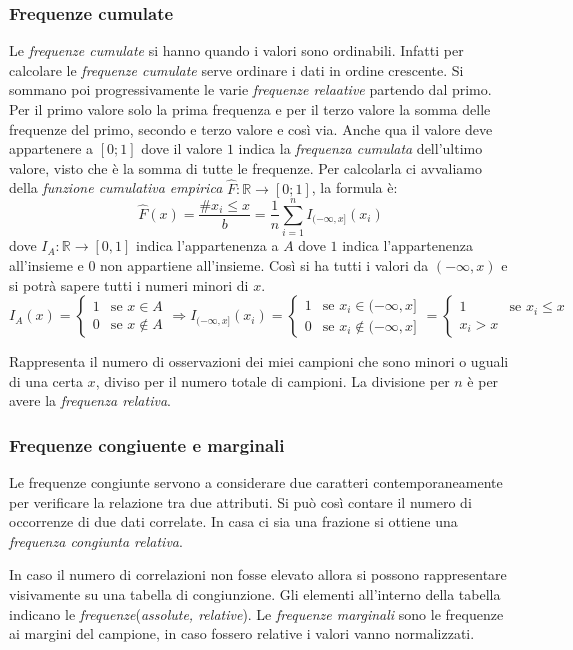 \documentclass{article}
\begin{document}
      \subsubsection*{Frequenze cumulate}
        Le \textit{frequenze cumulate} si hanno quando i valori sono ordinabili. Infatti per calcolare le \textit{frequenze cumulate} serve ordinare i dati in ordine crescente. Si sommano poi progressivamente le varie \textit{frequenze relaative} partendo dal primo. Per il primo valore solo la prima frequenza e per il terzo valore la somma delle frequenze del primo, secondo e terzo valore e così via. Anche qua il valore deve appartenere a $[0;1]$ dove il valore $1$ indica la \textit{frequenza cumulata} dell'ultimo valore, visto che è la somma di tutte le frequenze.
        Per calcolarla ci avvaliamo della \textit{funzione cumulativa empirica} $\hat{F}:\mathbb{R}\to[0;1]$, la formula è: $$\hat{F}(x)=\frac{\# x_i\le x}{b}=\frac{1}{n}\sum_{i=1}^{n}I_{(-\infty,x]}(x_i)$$ dove $I_A:\mathbb{R}\to [0,1]$ indica l'appartenenza a $A$ dove $1$ indica l'appartenenza all'insieme e $0$ non appartiene all'insieme. Così si ha tutti i valori da $(-\infty,x)$ e si potrà sapere tutti i numeri minori di $x$. 
        $$I_A(x)=\begin{cases}1 & \text{se } x \in A \\ 0 & \text{se } x \notin A\end{cases} \Rightarrow I_{(-\infty,x]}(x_i) = \begin{cases}1 & \text{se } x_i \in (-\infty,x] \\ 0 & \text{se } x_i \notin (-\infty,x] \end{cases} = \begin{cases}1 & \text{se } x_i \le x \\ x_i > x\end{cases}$$


        Rappresenta il numero  di osservazioni dei miei campioni che sono minori o uguali di una certa $x$, diviso per il numero totale di campioni. La divisione per $n$ è per avere la \textit{frequenza relativa}.

      \subsubsection*{Frequenze congiuente e marginali}
        Le frequenze congiunte servono a considerare due caratteri contemporaneamente per verificare la relazione tra due attributi. Si può così contare il numero di occorrenze di due dati correlate. In casa ci sia una frazione si ottiene una \textit{frequenza congiunta relativa}.

        In caso il numero di correlazioni non fosse elevato allora si possono rappresentare visivamente su una tabella di congiunzione. Gli elementi all'interno della tabella indicano le \textit{frequenze}(\textit{assolute, relative}). Le \textit{frequenze marginali} sono le frequenze ai margini del campione, in caso fossero relative i valori vanno normalizzati. 
\end{document}
